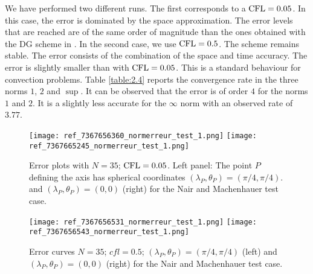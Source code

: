 We have performed two different runs. The first corresponds
to a $\mathop{\rm CFL}\nolimits=0.05$. In this case, 
the error is dominated by the 
space approximation.
The error levels that are reached are of the same order of magnitude 
than the ones obtained with the DG scheme in \cite{Nair-Jablonowski}.
In the second case, we use $\mathop{\rm CFL}\nolimits=0.5$.  The scheme remains stable.
The error consists of the combination
of the space and time accuracy.
The error is slightly smaller than with $\mathop{\rm CFL}\nolimits=0.05$. 
This is a standard behaviour for convection problems.
Table \ref{table:2.4} reports the convergence rate 
in the three norms $1$, $2$ and $\sup$. It can be observed
that the error is of order $4$ for the norms $1$ and $2$. It
is a slightly less accurate for the $\infty$ norm with 
an observed rate of $3.77$. 
\begin{figure}[!ht]
\texttt{[image: ref\_7367656360\_normerreur\_test\_1.png]}
\texttt{[image: ref\_7367665245\_normerreur\_test\_1.png]}
\label{erreur_cfl=0.05}
\caption{Error plots with $N=35$; $\mathop{\rm CFL}\nolimits=0.05$. Left panel: 
The point $P$ defining the axis has spherical coordinates  $(\lambda_P,  \theta_P) = (\pi / 4, \pi / 4)$. and $(\lambda_P, \theta_P) = (0,0)$ (right) for the Nair and Machenhauer test case.}
\end{figure}
\begin{figure}[!ht]
\texttt{[image: ref\_7367656531\_normerreur\_test\_1.png]}
\texttt{[image: ref\_7367656543\_normerreur\_test\_1.png]}
\label{erreur_cfl=0.5}
\caption{Error curves $N=35$; $cfl=0.5$; $(\lambda_P,  \theta_P) = (\pi / 4, \pi / 4)$ (left) and $(\lambda_P, \theta_P) = (0,0)$ (right) for the Nair and Machenhauer test case.}
\end{figure}
